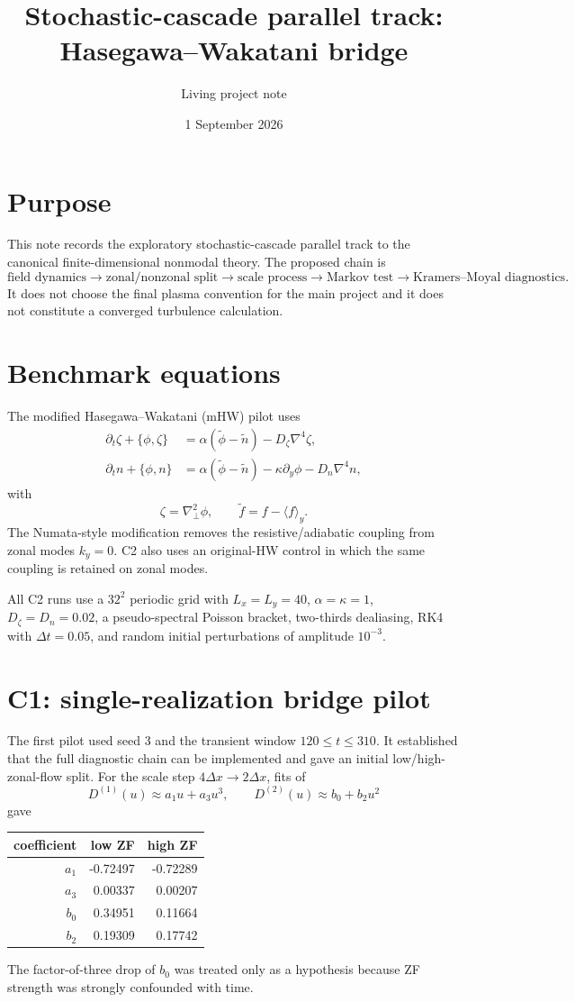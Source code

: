 \documentclass[11pt,a4paper]{article}
\title{Stochastic-cascade parallel track: Hasegawa--Wakatani bridge}
\author{Living project note}
\date{1 September 2026}
\begin{document}
\maketitle

\section{Purpose}
This note records the exploratory stochastic-cascade parallel track to the canonical finite-dimensional nonmodal theory. The proposed chain is
\[
\text{field dynamics}\to\text{zonal/nonzonal split}\to\text{scale process}
\to\text{Markov test}\to\text{Kramers--Moyal diagnostics}.
\]
It does not choose the final plasma convention for the main project and it does not constitute a converged turbulence calculation.

\section{Benchmark equations}
The modified Hasegawa--Wakatani (mHW) pilot uses
\begin{align}
\partial_t\zeta+\{\phi,\zeta\}
 &=\alpha(\widetilde\phi-\widetilde n)-D_\zeta\nabla^4\zeta,\\
\partial_t n+\{\phi,n\}
 &=\alpha(\widetilde\phi-\widetilde n)-\kappa\partial_y\phi-D_n\nabla^4 n,
\end{align}
with
\[
\zeta=\nabla_\perp^2\phi,\qquad
\widetilde f=f-\langle f\rangle_y.
\]
The Numata-style modification removes the resistive/adiabatic coupling from zonal modes $k_y=0$. C2 also uses an original-HW control in which the same coupling is retained on zonal modes.

All C2 runs use a $32^2$ periodic grid with $L_x=L_y=40$, $\alpha=\kappa=1$, $D_\zeta=D_n=0.02$, a pseudo-spectral Poisson bracket, two-thirds dealiasing, RK4 with $\Delta t=0.05$, and random initial perturbations of amplitude $10^{-3}$.

\section{C1: single-realization bridge pilot}
The first pilot used seed 3 and the transient window $120\le t\le310$. It established that the full diagnostic chain can be implemented and gave an initial low/high-zonal-flow split. For the scale step $4\Delta x\to2\Delta x$, fits of
\[
D^{(1)}(u)\approx a_1u+a_3u^3,\qquad
D^{(2)}(u)\approx b_0+b_2u^2
\]
gave
\begin{center}
\begin{tabular}{rrr}
\toprule
coefficient & low ZF & high ZF\\
\midrule
$a_1$ & -0.72497 & -0.72289\\
$a_3$ & 0.00337 & 0.00207\\
$b_0$ & 0.34951 & 0.11664\\
$b_2$ & 0.19309 & 0.17742\\
\bottomrule
\end{tabular}
\end{center}
The factor-of-three drop of $b_0$ was treated only as a hypothesis because ZF strength was strongly confounded with time.
\end{document}
